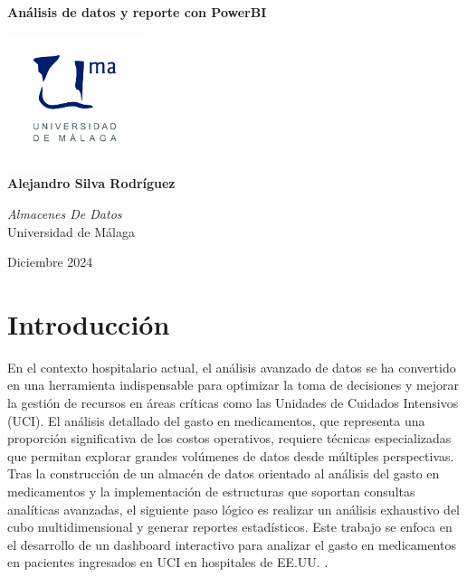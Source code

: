 \documentclass{article}
\begin{document}
	
	
	
	\begin{titlepage}
		\centering
		\vspace*{3cm}
		
		{\Huge \textbf{Análisis de datos y reporte con PowerBI}\\[0.5cm]}
		
		\vspace{2cm}
		\includegraphics[width=0.3\textwidth]{images/uma_logo.jpg}\\[1cm]
		
		{\LARGE \textbf{Alejandro Silva Rodríguez}\\[0.5cm]}

		{\large \textit{Almacenes De Datos}\\
			Universidad de Málaga\\
		}
		
		\vfill
		
		{\large Diciembre 2024}
	\end{titlepage}
	
	\tableofcontents
	
	\newpage
\section{Introducción}
\label{sec:introduccion}

En el contexto hospitalario actual, el análisis avanzado de datos se ha convertido en una herramienta indispensable para optimizar la toma de decisiones y mejorar la gestión de recursos en áreas críticas como las Unidades de Cuidados Intensivos (UCI). El análisis detallado del gasto en medicamentos, que representa una proporción significativa de los costos operativos, requiere técnicas especializadas que permitan explorar grandes volúmenes de datos desde múltiples perspectivas.\\

Tras la construcción de un almacén de datos orientado al análisis del gasto en medicamentos y la implementación de estructuras que soportan consultas analíticas avanzadas, el siguiente paso lógico es realizar un análisis exhaustivo del cubo multidimensional y generar reportes estadísticos. Este trabajo se enfoca en el desarrollo de un dashboard interactivo para analizar el gasto en medicamentos en pacientes ingresados en UCI en hospitales de EE.UU. \cite{eicu_crd}.
\end{document}
